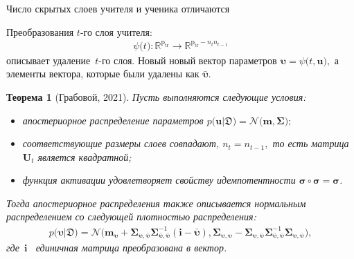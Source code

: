\documentclass[10pt,pdf,hyperref={unicode}]{beamer}
\newtheorem{rustheorem}{Теорема}
\begin{document}
\begin{frame}{Число скрытых слоев учителя и ученика отличаются}

Преобразования $t$-го слоя учителя:
\[
\begin{aligned}
\psi\bigr(t\bigr) : \mathbb{R}^{\text{p}_{\text{tr}}} \to \mathbb{R}^{\text{p}_{\text{tr}}-n_tn_{t-1}}
\end{aligned}
\]
описывает удаление~$t$-го слоя. Новый новый вектор параметров $\bm{\upsilon} = \psi\bigr(t, \textbf{u}\bigr),$ а элементы вектора, которые были удалены как $\bar{\bm{\upsilon}}.$

\begin{rustheorem}[Грабовой, 2021]
Пусть выполняются следующие условия:
\begin{itemize}
\item апостериорное распределение параметров $p\bigr(\textbf{u}|\mathfrak{D}\bigr) = \mathcal{N}\bigr(\textbf{m}, \bm{\Sigma}\bigr);$
\item соответствующие размеры слоев совпадают, $n_t=n_{t-1},$ то есть матрица $\textbf{U}_t$ является квадратной;
\item функция активации удовлетворяет свойству идемпотентности $\bm{\sigma} \circ \bm{\sigma} = \bm{\sigma}$.
\end{itemize}
Тогда апостериорное распределения также описывается нормальным распределением со следующей плотностью распределения:
\[
\label{eq:ap:5}
\begin{aligned}
p\bigr(\bm{\upsilon}|\mathfrak{D}\bigr) = \mathcal{N}\bigr(\textbf{m}_{\bm{\upsilon}}+\bm{\Sigma}_{\bm{\upsilon},\bar{\bm{\upsilon}}} \bm{\Sigma}_{\bar{\bm{\upsilon}},\bar{\bm{\upsilon}}}^{-1} \left(\textbf{i} - \bar{\bm{\upsilon}}\right), \bm{\Sigma}_{\bm{\upsilon},\bm{\upsilon}} - \bm{\Sigma}_{\bm{\upsilon},\bar{\bm{\upsilon}}}\bm{\Sigma}_{\bar{\bm{\upsilon}},\bar{\bm{\upsilon}}}^{-1}\bm{\Sigma}_{\bm{\upsilon},\bar{\bm{\upsilon}}}\bigr),
\end{aligned}
\]
где~$\textbf{i}$~ единичная матрица преобразована в вектор.
\end{rustheorem}

\end{frame}
\end{document}
